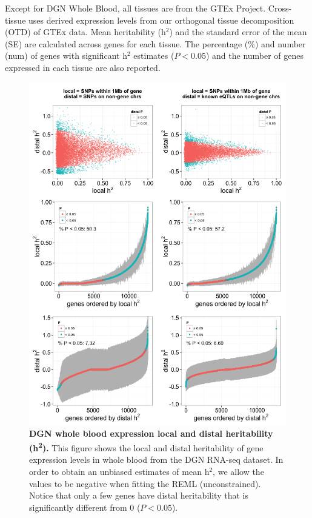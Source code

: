 \documentclass[10pt,letterpaper]{article}
\begin{document}
\begin{table}[!ht]
\begin{adjustwidth}{-2.25in}{0in}
\begin{tabular}{lrrrrr}
   \hline
\end{tabular}
\begin{flushleft} Except for DGN Whole Blood, all tissues are from the GTEx Project. Cross-tissue uses derived expression levels from our orthogonal tissue decomposition (OTD) of GTEx data. Mean heritability (h$^2$) and the standard error of the mean (SE) are calculated across genes for each tissue. The percentage (\%) and number (num) of genes with significant h$^2$ estimates ($P<0.05$) and the number of genes expressed in each tissue are also reported. 
\end{flushleft}
\label{table-h2}
\end{adjustwidth}
\end{table}

\clearpage

\begin{figure}[H]
\includegraphics[width=12cm]{Figures/Fig-DGN-jt-h2-UNCONSTRAINED.png}
\caption{{\bf DGN whole blood expression local and distal heritability (h\textsuperscript{2}).} 
%
This figure shows the local and distal heritability of gene expression levels in whole blood from the DGN RNA-seq dataset. In order to obtain an unbiased estimates of mean h$^2$, we allow the values to be negative when fitting the REML (unconstrained). Notice that only a few genes have distal heritability that is significantly different from 0 ($P<0.05$). 
}
\end{figure}
\end{document}
